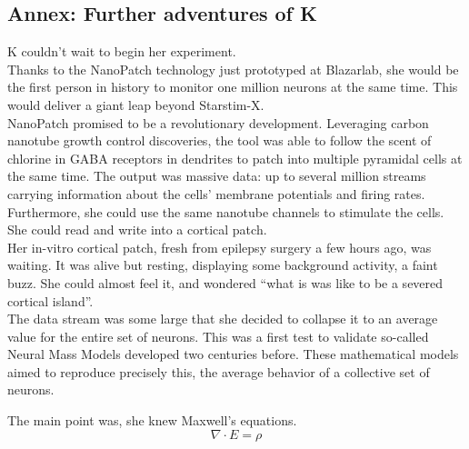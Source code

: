 \documentclass[11pt,a4,oneside]{amsart}
\begin{document}
  {\small
 \begin{tcolorbox}
 \section*{Annex: Further adventures of K}
{\Large K} couldn’t wait to begin her experiment. 
\ \\

Thanks to the NanoPatch technology just prototyped at Blazarlab, she would be the first person in history to monitor one million neurons at the same time. This would deliver a giant leap beyond Starstim-X. 
\ \\

NanoPatch promised to be a revolutionary development. Leveraging carbon nanotube growth control discoveries, the tool was able to follow the scent of chlorine in GABA receptors in dendrites to patch into multiple pyramidal cells at the same time. The output was massive data: up to several million streams carrying information about the cells' membrane potentials and firing rates.
\ \\

Furthermore, she could use the same nanotube channels to stimulate the cells. She could read and write into a cortical patch.
\ \\

Her in-vitro cortical patch, fresh from epilepsy surgery a few hours ago, was waiting. It was alive but resting, displaying some background activity, a faint buzz. She could almost feel it, and wondered “what is was like to be a severed cortical island”.
\ \\

The data stream was some large that she decided to collapse it to an average value for the entire set of neurons. This was a first test to validate so-called Neural Mass Models developed two centuries before. These mathematical models aimed to reproduce precisely this, the average behavior of a collective set of neurons.

The main point was, she knew Maxwell's equations. \ \\

\begin{equation}
\nabla \cdot E =\rho 
\end{equation}

 \end{tcolorbox} 
 }
 
\printbibliography
\end{document}
